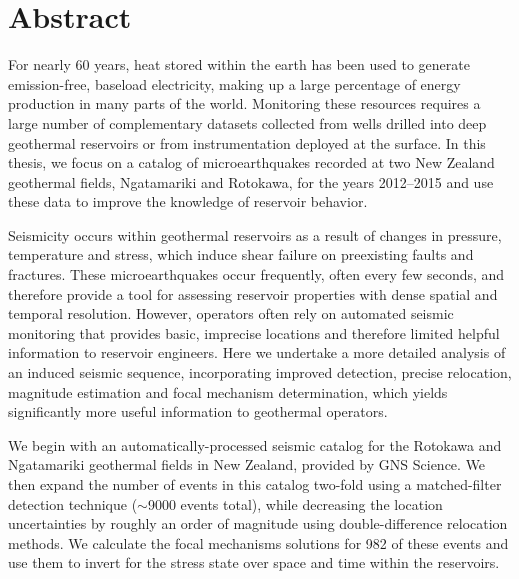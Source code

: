 \chapter*{Abstract}
For nearly 60 years, heat stored within the earth has been used to generate emission-free, baseload electricity, making up a large percentage of energy production in many parts of the world. Monitoring these resources requires a large number of complementary datasets collected from wells drilled into deep geothermal reservoirs or from instrumentation deployed at the surface. In this thesis, we focus on a catalog of microearthquakes recorded at two New Zealand geothermal fields, Ngatamariki and Rotokawa, for the years 2012--2015 and use these data to improve the knowledge of reservoir behavior.

Seismicity occurs within geothermal reservoirs as a result of changes in pressure, temperature and stress, which induce shear failure on preexisting faults and fractures. These microearthquakes occur frequently, often every few seconds, and therefore provide a tool for assessing reservoir properties with dense spatial and temporal resolution. However, operators often rely on automated seismic monitoring that provides basic, imprecise locations and therefore limited helpful information to reservoir engineers. Here we undertake a more detailed analysis of an induced seismic sequence, incorporating improved detection, precise relocation, magnitude estimation and focal mechanism determination, which yields significantly more useful information to geothermal operators.

We begin with an automatically-processed seismic catalog for the Rotokawa and Ngatamariki geothermal fields in New Zealand, provided by GNS Science. We then expand the number of events in this catalog two-fold using a matched-filter detection technique ($\sim$9000 events total), while decreasing the location uncertainties by roughly an order of magnitude using double-difference relocation methods. We calculate the focal mechanisms solutions for 982 of these events and use them to invert for the stress state over space and time within the reservoirs.

